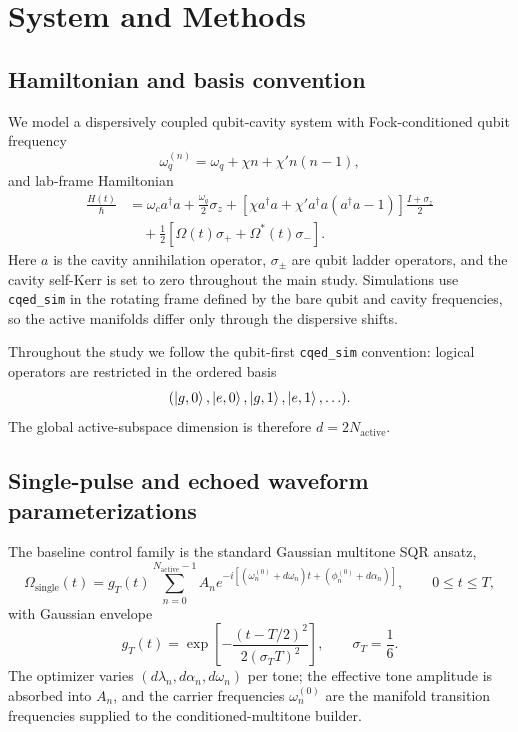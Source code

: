 \documentclass[aps,pra,twocolumn,reprint,floatfix,amsmath,amssymb]{revtex4-2}
\begin{document}
\section{System and Methods}

\subsection{Hamiltonian and basis convention}
We model a dispersively coupled qubit-cavity system with Fock-conditioned qubit frequency
\[
\omega_q^{(n)} = \omega_q + \chi n + \chi' n(n-1),
\]
and lab-frame Hamiltonian
\begin{align}
\frac{H(t)}{\hbar} &= \omega_c a^\dagger a + \frac{\omega_q}{2}\sigma_z
+ \left[\chi a^\dagger a + \chi' a^\dagger a(a^\dagger a - 1)\right]\frac{I+\sigma_z}{2} \\
&\quad + \frac{1}{2}\left[\Omega(t)\sigma_+ + \Omega^*(t)\sigma_-\right].
\end{align}
Here \(a\) is the cavity annihilation operator, \(\sigma_\pm\) are qubit ladder operators, and the cavity self-Kerr is set to zero throughout the main study. Simulations use \texttt{cqed\_sim} in the rotating frame defined by the bare qubit and cavity frequencies, so the active manifolds differ only through the dispersive shifts.

Throughout the study we follow the qubit-first \texttt{cqed\_sim} convention: logical operators are restricted in the ordered basis
\[
(\ket{g,0},\ket{e,0},\ket{g,1},\ket{e,1},\ldots).
\]
The global active-subspace dimension is therefore \(d = 2N_{\mathrm{active}}\).

\subsection{Single-pulse and echoed waveform parameterizations}
The baseline control family is the standard Gaussian multitone SQR ansatz,
\[
\Omega_{\mathrm{single}}(t) = g_T(t)\sum_{n=0}^{N_{\mathrm{active}}-1} A_n e^{-i[(\omega_n^{(0)} + d\omega_n)t + (\phi_n^{(0)} + d\alpha_n)]},
\qquad 0 \le t \le T,
\]
with Gaussian envelope
\[
g_T(t) = \exp\!\left[-\frac{(t-T/2)^2}{2(\sigma_T T)^2}\right],
\qquad \sigma_T = \frac{1}{6}.
\]
The optimizer varies \((d\lambda_n,d\alpha_n,d\omega_n)\) per tone; the effective tone amplitude is absorbed into \(A_n\), and the carrier frequencies \(\omega_n^{(0)}\) are the manifold transition frequencies supplied to the conditioned-multitone builder.
\end{document}
